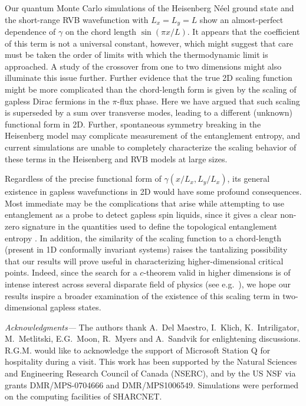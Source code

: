 \documentclass[prl,aps,twocolumn,floatfix,amsmath,amssymb,superscriptaddress,tightenlines]{revtex4}
\begin{document}
Our quantum Monte Carlo simulations of the Heisenberg N\'eel ground state and the short-range RVB wavefunction with $L_x=L_y=L$ show an almost-perfect dependence of $\gamma$ on the chord length $\sin(\pi x/L)$.
It appears that the coefficient of this term is not a universal constant, however, which might suggest that care must be taken the order of limits with which the thermodynamic limit is approached. A study of the crossover from one to two dimensions might also illuminate this issue further.  Further evidence that the true 2D scaling function might be more complicated than the chord-length form is given by the scaling of gapless Dirac fermions in the $\pi$-flux phase. Here we have argued that such scaling is superseded by a sum over transverse modes, leading to a different (unknown) functional form in 2D.  Further,  spontaneous symmetry breaking in the Heisenberg model may complicate measurement of the entanglement entropy, and current simulations are unable to completely characterize the scaling behavior of these terms in the Heisenberg and RVB models at large sizes.

Regardless of the precise functional form of $\gamma(x/L_x,L_y/L_x)$, its general existence in gapless wavefunctions in 2D would have some profound consequences.  
Most immediate may be the complications that arise while attempting to use entanglement as a probe to detect gapless spin liquids, since it gives a clear non-zero signature in the quantities used to define the topological entanglement entropy \cite{KP,LW}.
In addition, the similarity of the scaling function to a chord-length (present in 1D conformally invariant systems) 
raises the tantalizing possibility that our results will prove useful in characterizing higher-dimensional critical points.
Indeed, since the search for a $c$-theorem \cite{Zamo} valid in higher dimensions is of intense interest across several disparate field of physics (see e.g.\ \cite{Cardy88,ryu,Myers,Komargodski}),
we hope our results inspire a broader examination of the existence of this scaling term in two-dimensional gapless states.

{\it Acknowledgments---} 
The authors thank A.~Del Maestro, I.~Klich, K.~Intriligator,  M.~Metlitski, E.G.~Moon, R.~Myers and A.~Sandvik for enlightening discussions. 
R.G.M. would like to acknowledge the support of Microsoft Station Q for hospitality during a visit.
This work has been supported by the Natural Sciences and Engineering
Research Council of Canada (NSERC), and by the US NSF via grants DMR/MPS-0704666 and DMR/MPS1006549.  Simulations were performed on the computing facilities of SHARCNET.



\end{document}
